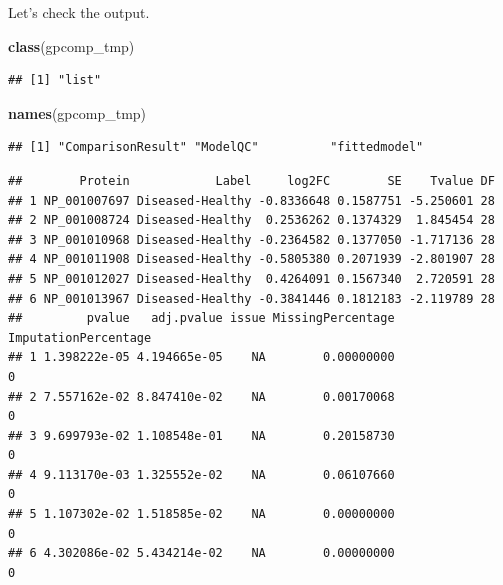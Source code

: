 \documentclass[]{book}
\newenvironment{Shaded}{\begin{snugshade}}{\end{snugshade}}
\newcommand{\CommentTok}[1]{\textcolor[rgb]{0.56,0.35,0.01}{\textit{#1}}}
\newcommand{\KeywordTok}[1]{\textcolor[rgb]{0.13,0.29,0.53}{\textbf{#1}}}
\newcommand{\NormalTok}[1]{#1}
\newcommand{\OperatorTok}[1]{\textcolor[rgb]{0.81,0.36,0.00}{\textbf{#1}}}
\begin{document}
Let's check the output.

\begin{Shaded}
\begin{Highlighting}[]
\KeywordTok{class}\NormalTok{(gpcomp_tmp)}
\end{Highlighting}
\end{Shaded}

\begin{verbatim}
## [1] "list"
\end{verbatim}

\begin{Shaded}
\begin{Highlighting}[]
\KeywordTok{names}\NormalTok{(gpcomp_tmp)}
\end{Highlighting}
\end{Shaded}

\begin{verbatim}
## [1] "ComparisonResult" "ModelQC"          "fittedmodel"
\end{verbatim}

\begin{Shaded}
\end{Shaded}

\begin{verbatim}
##        Protein            Label     log2FC        SE    Tvalue DF
## 1 NP_001007697 Diseased-Healthy -0.8336648 0.1587751 -5.250601 28
## 2 NP_001008724 Diseased-Healthy  0.2536262 0.1374329  1.845454 28
## 3 NP_001010968 Diseased-Healthy -0.2364582 0.1377050 -1.717136 28
## 4 NP_001011908 Diseased-Healthy -0.5805380 0.2071939 -2.801907 28
## 5 NP_001012027 Diseased-Healthy  0.4264091 0.1567340  2.720591 28
## 6 NP_001013967 Diseased-Healthy -0.3841446 0.1812183 -2.119789 28
##         pvalue   adj.pvalue issue MissingPercentage ImputationPercentage
## 1 1.398222e-05 4.194665e-05    NA        0.00000000                    0
## 2 7.557162e-02 8.847410e-02    NA        0.00170068                    0
## 3 9.699793e-02 1.108548e-01    NA        0.20158730                    0
## 4 9.113170e-03 1.325552e-02    NA        0.06107660                    0
## 5 1.107302e-02 1.518585e-02    NA        0.00000000                    0
## 6 4.302086e-02 5.434214e-02    NA        0.00000000                    0
\end{verbatim}
\end{document}
